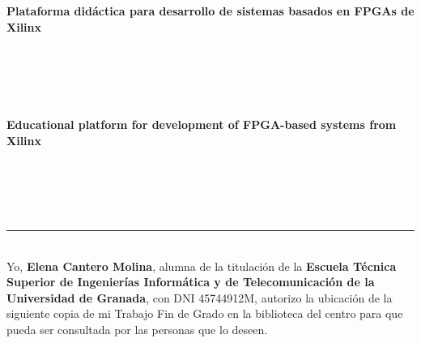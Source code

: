 \thispagestyle{empty}
\cleardoublepage

\thispagestyle{empty}

\begin{center}
{\large\bfseries Plataforma didáctica para desarrollo de sistemas basados en FPGAs de Xilinx}\\
\end{center}
\begin{center}
\myName\\
\end{center}

\\

\vspace{0.7cm}
\\



\cleardoublepage


\thispagestyle{empty}


\begin{center}
{\large\bfseries Educational platform for development of FPGA-based systems from Xilinx}\\
\end{center}
\begin{center}
\myName\\
\end{center}

\\

\vspace{0.7cm}
\\



\clearpage
\thispagestyle{empty}

\noindent\rule[-1ex]{\textwidth}{2pt}\\[4.5ex]

Yo, \textbf{Elena Cantero Molina}, alumna de la titulación \myDegree de la \textbf{Escuela Técnica Superior
de Ingenierías Informática y de Telecomunicación de la Universidad de Granada}, con DNI 45744912M, autorizo la
ubicación de la siguiente copia de mi Trabajo Fin de Grado en la biblioteca del centro para que pueda ser
consultada por las personas que lo deseen.

